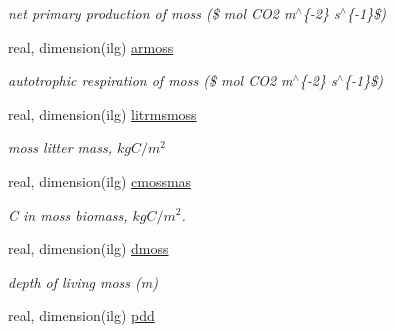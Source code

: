 \begin{DoxyCompactItemize}
\begin{DoxyCompactList}\small\item\em net primary production of moss (\$ mol C\+O2 m$^\wedge$\{-\/2\} s$^\wedge$\{-\/1\}\$) \end{DoxyCompactList}\item 
\hypertarget{structctem__statevars_1_1veg__gat_a81bba029245578be36fc61e12e26f482}{}real, dimension(ilg) \hyperlink{structctem__statevars_1_1veg__gat_a81bba029245578be36fc61e12e26f482}{armoss}\label{structctem__statevars_1_1veg__gat_a81bba029245578be36fc61e12e26f482}

\begin{DoxyCompactList}\small\item\em autotrophic respiration of moss (\$ mol C\+O2 m$^\wedge$\{-\/2\} s$^\wedge$\{-\/1\}\$) \end{DoxyCompactList}\item 
\hypertarget{structctem__statevars_1_1veg__gat_a45d85c222d3fd8de247cab02e9211ac7}{}real, dimension(ilg) \hyperlink{structctem__statevars_1_1veg__gat_a45d85c222d3fd8de247cab02e9211ac7}{litrmsmoss}\label{structctem__statevars_1_1veg__gat_a45d85c222d3fd8de247cab02e9211ac7}

\begin{DoxyCompactList}\small\item\em moss litter mass, $kg C/m^2$ \end{DoxyCompactList}\item 
\hypertarget{structctem__statevars_1_1veg__gat_a61630732de77398f2163d1f4cc54ef4a}{}real, dimension(ilg) \hyperlink{structctem__statevars_1_1veg__gat_a61630732de77398f2163d1f4cc54ef4a}{cmossmas}\label{structctem__statevars_1_1veg__gat_a61630732de77398f2163d1f4cc54ef4a}

\begin{DoxyCompactList}\small\item\em C in moss biomass, $kg C/m^2$. \end{DoxyCompactList}\item 
\hypertarget{structctem__statevars_1_1veg__gat_af2f0850a504fff247ffd5687ec41e05a}{}real, dimension(ilg) \hyperlink{structctem__statevars_1_1veg__gat_af2f0850a504fff247ffd5687ec41e05a}{dmoss}\label{structctem__statevars_1_1veg__gat_af2f0850a504fff247ffd5687ec41e05a}

\begin{DoxyCompactList}\small\item\em depth of living moss (m) \end{DoxyCompactList}\item 
\hypertarget{structctem__statevars_1_1veg__gat_ad5086ec1c276f83a2b90f4968fca197f}{}real, dimension(ilg) \hyperlink{structctem__statevars_1_1veg__gat_ad5086ec1c276f83a2b90f4968fca197f}{pdd}\label{structctem__statevars_1_1veg__gat_ad5086ec1c276f83a2b90f4968fca197f}


\end{DoxyCompactItemize}
